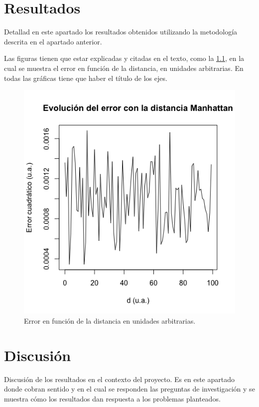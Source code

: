 \documentclass[IB,BIB]{TFUOC}%
\begin{document}
\chapter{Resultados}

Detallad en este apartado los resultados obtenidos utilizando la metodología descrita en el apartado anterior.

Las figuras tienen que estar explicadas y citadas en el texto, como la \ref{fig:my_label}, en la cual se muestra el error en función de la distancia, en unidades arbitrarias. En todas las gráficas tiene que haber el título de los ejes.

\begin{figure}[!htbp]
    \centering
    \includegraphics[width=7truecm]{Rplotmanh.png}
    \caption{Error en función de la distancia en unidades arbitrarias.}
    \label{fig:my_label}
\end{figure}

\chapter{Discusión}
Discusión de los resultados en el contexto del proyecto. Es en este apartado donde cobran sentido y en el cual se responden las preguntas de investigación y se muestra cómo los resultados dan respuesta a los problemas planteados.
\end{document}
